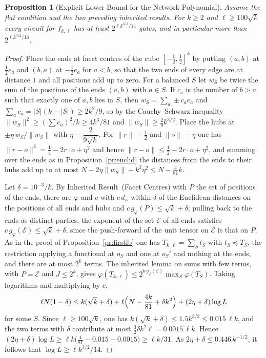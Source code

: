 \documentclass[11pt,letterpaper]{report}
\theoremstyle{plain}
\newtheorem{proposition}[theorem]{Proposition}
\theoremstyle{definition}
\theoremstyle{remark}
\begin{document}
\begin{proposition}[Explicit Lower Bound for the Network Polynomial]\label{pr:explicitlb}
Assume the flat condition and the two preceding inherited results. For $k\ge2$ and $\ell\ge100\sqrt k$ every circuit for $f_{k,\ell}$ has at least $2^{\ell k^{3/2}/14}$ gates, and in particular more than $2^{\ell k^{3/2}/16}$.
\end{proposition}
\begin{proof}
Place the ends at facet centres of the cube $[-\tfrac12,\tfrac12]^k$ by putting $(a,b)$ at $\tfrac12e_a$ and $(b,a)$ at $-\tfrac12e_a$ for $a<b$, so that the two ends of every edge are at distance $1$ and all positions add up to zero. For a balanced $S$ let $w_S$ be twice the sum of the positions of the ends $(a,b)$ with $a\in S$. If $c_a$ is the number of $b>a$ such that exactly one of $a,b$ lies in $S$, then $w_S=\sum_a\pm c_ae_a$ and $\sum_ac_a=|S|(k-|S|)\ge2k^2/9$, so by the Cauchy--Schwarz inequality $\|w_S\|^2\ge(\sum c_a)^2/k\ge4k^3/81$ and $\|w_S\|\ge\tfrac29k^{3/2}$. Place the hubs at $\pm\eta\,w_S/\|w_S\|$ with $\eta=\dfrac2{9\sqrt k}$. For $\|r\|=\tfrac12$ and $\|o\|=\eta$ one has $\|r-o\|^2=\tfrac14-2r\cdot o+\eta^2$ and hence $\|r-o\|\le\tfrac12-2r\cdot o+\eta^2$, and summing over the ends as in Proposition~\ref{pr:euclid} the distances from the ends to their hubs add up to at most $N-2\eta\|w_S\|+k^2\eta^2\le N-\tfrac4{81}k$.

Let $\delta=10^{-3}/k$. By Inherited Result~(Facet Centres) with $P$ the set of positions of the ends, there are $\varphi$ and $c$ with $c\,d_\varphi$ within $\delta$ of the Euclidean distances on the positions of all ends and hubs and $c\,g_\varphi(P)\le\sqrt k+\delta$; pulling back to the ends as distinct parties, the exponent of the set $\mathcal E$ of all ends satisfies $c\,g_\varphi(\mathcal E)\le\sqrt k+\delta$, since the push-forward of the unit tensor on $\mathcal E$ is that on $P$. As in the proof of Proposition~\ref{pr:firstlb} one has $T_{k,\ell}=\sum_St_S$ with $t_S\preceq T_S$, the restriction applying a functional at $o_S$ and one at $o_S'$ and nothing at the ends, and there are at most $2^k$ terms. The inherited lemma on sums with few terms, with $P=\mathcal E$ and $J\le2^k$, gives $\varphi(T_{k,\ell})\le2^{k\,g_\varphi(\mathcal E)}\max_S\varphi(T_S)$. Taking logarithms and multiplying by $c$,
\[
\ell N(1-\delta)\le k(\sqrt k+\delta)+\ell\Bigl(N-\frac{4k}{81}+\delta k^2\Bigr)+(2\eta+\delta)\log L
\]
for some $S$. Since $\ell\ge100\sqrt k$, one has $k(\sqrt k+\delta)\le1.5k^{3/2}\le0.015\,\ell k$, and the two terms with $\delta$ contribute at most $\tfrac32\delta k^2\ell=0.0015\,\ell k$. Hence $(2\eta+\delta)\log L\ge\ell k\bigl(\tfrac4{81}-0.015-0.0015\bigr)\ge\ell k/31$. As $2\eta+\delta\le0.446\,k^{-1/2}$, it follows that $\log L\ge\ell k^{3/2}/14$.
\end{proof}
\end{document}
